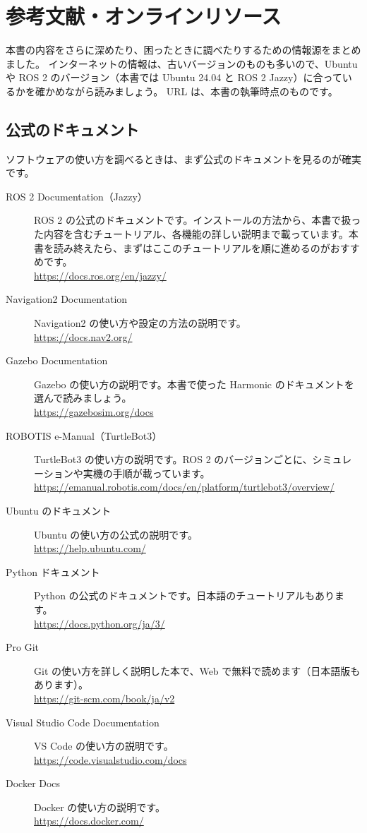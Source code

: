 \chapter{参考文献・オンラインリソース}
\label{app:references}

本書の内容をさらに深めたり、困ったときに調べたりするための情報源をまとめました。
インターネットの情報は、古いバージョンのものも多いので、Ubuntu や ROS 2 のバージョン（本書では Ubuntu 24.04 と ROS 2 Jazzy）に合っているかを確かめながら読みましょう。
URL は、本書の執筆時点のものです。

\section{公式のドキュメント}
\label{sec:references-official}

ソフトウェアの使い方を調べるときは、まず公式のドキュメントを見るのが確実です。

\begin{description}
  \item[ROS 2 Documentation（Jazzy）] ROS 2 の公式のドキュメントです。インストールの方法から、本書で扱った内容を含むチュートリアル、各機能の詳しい説明まで載っています。本書を読み終えたら、まずはここのチュートリアルを順に進めるのがおすすめです。\\\url{https://docs.ros.org/en/jazzy/}
  \item[Navigation2 Documentation] Navigation2 の使い方や設定の方法の説明です。\\\url{https://docs.nav2.org/}
  \item[Gazebo Documentation] Gazebo の使い方の説明です。本書で使った Harmonic のドキュメントを選んで読みましょう。\\\url{https://gazebosim.org/docs}
  \item[ROBOTIS e-Manual（TurtleBot3）] TurtleBot3 の使い方の説明です。ROS 2 のバージョンごとに、シミュレーションや実機の手順が載っています。\\\url{https://emanual.robotis.com/docs/en/platform/turtlebot3/overview/}
  \item[Ubuntu のドキュメント] Ubuntu の使い方の公式の説明です。\\\url{https://help.ubuntu.com/}
  \item[Python ドキュメント] Python の公式のドキュメントです。日本語のチュートリアルもあります。\\\url{https://docs.python.org/ja/3/}
  \item[Pro Git] Git の使い方を詳しく説明した本で、Web で無料で読めます（日本語版もあります）。\\\url{https://git-scm.com/book/ja/v2}
  \item[Visual Studio Code Documentation] VS Code の使い方の説明です。\\\url{https://code.visualstudio.com/docs}
  \item[Docker Docs] Docker の使い方の説明です。\\\url{https://docs.docker.com/}
\end{description}


